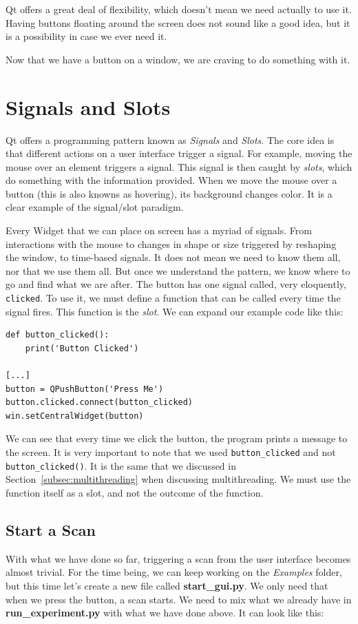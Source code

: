 Qt offers a great deal of flexibility, which doesn't mean we need actually to use it. Having buttons floating around the screen does not sound like a good idea, but it is a possibility in case we ever need it.

Now that we have a button on a window, we are craving to do something with it.


\section{Signals and Slots}\label{sec:signals-slots}
Qt offers a programming pattern known as \emph{Signals} and \emph{Slots}. The core idea is that different actions on a user interface trigger a signal. For example, moving the mouse over an element triggers a signal. This signal is then caught by \emph{slots}, which do something with the information provided. When we move the mouse over a button (this is also knowns as hovering), its background changes color. It is a clear example of the signal/slot paradigm.

Every Widget that we can place on screen has a myriad of signals. From interactions with the mouse to changes in shape or size triggered by reshaping the window, to time-based signals. It does not mean we need to know them all, nor that we use them all. But once we understand the pattern, we know where to go and find what we are after. The button has one signal called, very eloquently, \texttt{clicked}. To use it, we must define a function that can be called every time the signal fires. This function is the \emph{slot}. We can expand our example code like this:

\begin{verbatim}
def button_clicked():
    print('Button Clicked')

[...]
button = QPushButton('Press Me')
button.clicked.connect(button_clicked)
win.setCentralWidget(button)
\end{verbatim}

We can see that every time we click the button, the program prints a message to the screen. It is very important to note that we used \texttt{button\_clicked} and not \texttt{button\_clicked()}. It is the same that we discussed in Section~\ref{subsec:multithreading} when discussing multithreading. We must use the function itself as a slot, and not the outcome of the function.

\subsection{Start a Scan}\label{subsec:start-scan-gui}
With what we have done so far, triggering a scan from the user interface becomes almost trivial. For the time being, we can keep working on the \emph{Examples} folder, but this time let's create a new file called \textbf{start\_gui.py}. We only need that when we press the button, a scan starts. We need to mix what we already have in \textbf{run\_experiment.py} with what we have done above. It can look like this:

